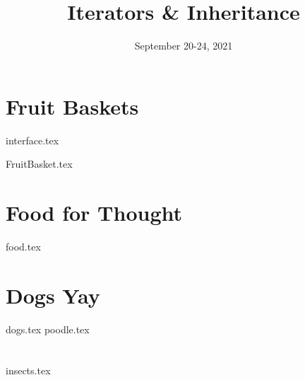 \documentclass[11pt]{exam}
\title{Iterators \& Inheritance}
\date{September 20-24, 2021}
\begin{document}
\maketitle

\section{Fruit Baskets}
{interface.tex}

\begin{questions}
{FruitBasket.tex}
\end{questions}

\clearpage

\section{Food for Thought}
\begin{questions}
{food.tex}
\end{questions}

\clearpage


\section{Dogs Yay}
\begin{questions}
{dogs.tex}
{poodle.tex}
\end{questions}

\clearpage

\section{}
\begin{questions}
{insects.tex}
\end{questions}
\end{document}
